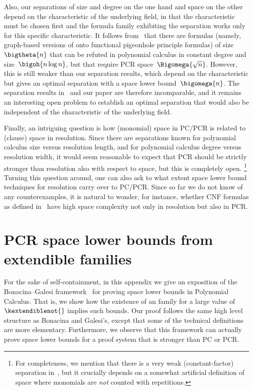 Also, our separations of size and degree on the one hand and space on
the other depend on the characteristic of the 
underlying field, in that the characteristic must be chosen
first and the formula  family exhibiting the separation works only
for this specific characteristic.
It follows from~\cite{GKT19SpaceWidth} that there are formulas
(namely, graph-based versions of onto functional pigeonhole principle
formulas) of size $\bigtheta{n}$ that can be refuted in polynomial
calculus  in constant degree and size~$\bigoh{n \log n}$,
but that require PCR space~$\Bigomega{\sqrt{n}}$.
However, this is still weaker than our separation results, which
depend on the characteristic but gives an optimal separation with a
space lower bound~$\bigomega{n}$. The separation results
in~\cite{GKT19SpaceWidth} and our paper are therefore incomparable,
and it remains an interesting open problem to establish an optimal
separation that would also be independent of the characteristic of the
underlying field.

Finally, an intriguing question is how (monomial) space in PC/PCR is
related to (clause) space in resolution. Since there are separations
known for polynomial calculus size versus resolution length, and for
polynomial calculus degree versus resolution width, it would seem
reasonable to expect that PCR should be strictly stronger than
resolution also with respect to space, but this is completely open.%
\footnote{%
  For completeness, we mention that there is a very weak
  (constant-factor) separation in~\cite{ABRW02SpaceComplexity}, but it
  crucially depends on a somewhat artificial definition of space where
  monomials are \emph{not} counted with repetitions.}  
%
%
Turning this question around, one can also ask to
what extent space lower bound techniques for
resolution carry over to PC/PCR. Since so far we do not know of any
%
counterexamples, %
it is natural to wonder, for instance, whether
 CNF formulas as defined in~%
\cite{ABRW02SpaceComplexity} have high space complexity not only in
resolution but also in PCR.
 
%
%

\appendix
%
\section{PCR space lower bounds from extendible families}
\label{sec:bg-framework}

%
%
%
%
%
For the sake of self-containment, in this appendix we give an
exposition of the Bonacina--Galesi
framework~\cite{BG15Framework} for proving space lower bounds
in Polynomial Calculus. %
That is, we
show how the existence of an
\kextendible family for a large value of $\kextendiblenot{}$
implies such bounds. %
Our proof follows the same high level structure as Bonacina and Galesi's, except that some of the technical definitions are more elementary. Furthermore, we observe that this
framework can actually prove space lower
bounds for a proof system that %
is   %
stronger than PC or PCR.

